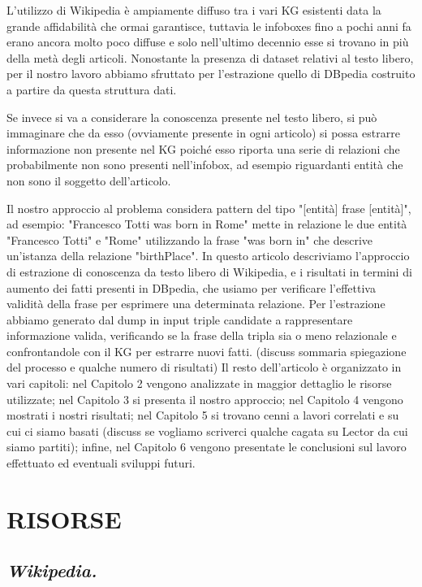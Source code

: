 \documentclass[10pt,a4paper,twocolumn]{article}
\begin{document}
L'utilizzo di Wikipedia è ampiamente diffuso tra i vari KG esistenti data la grande affidabilità che ormai garantisce, tuttavia le infoboxes fino a pochi anni fa erano ancora molto poco diffuse e solo nell'ultimo decennio esse si trovano in più della metà degli articoli. Nonostante la presenza di dataset relativi al testo libero, per il nostro lavoro abbiamo sfruttato per l'estrazione quello di DBpedia costruito a partire da questa struttura dati.

Se invece si va a considerare la conoscenza presente nel testo libero, si può immaginare che da esso (ovviamente presente in ogni articolo) si possa estrarre informazione non presente nel KG poiché esso riporta una serie di relazioni che probabilmente non sono presenti nell'infobox, ad esempio riguardanti entità che non sono il soggetto dell'articolo.

Il nostro approccio al problema considera pattern del tipo 
"[entità] frase [entità]", ad esempio: "Francesco Totti was born in Rome" mette in relazione le due entità "Francesco Totti" e "Rome" utilizzando la frase "was born in" che descrive un'istanza della relazione "birthPlace".
In questo articolo descriviamo l'approccio di estrazione di conoscenza da testo libero di Wikipedia, e i risultati in termini di aumento dei fatti presenti in DBpedia, che usiamo per verificare l'effettiva validità della frase per esprimere una determinata relazione.
Per l'estrazione abbiamo generato dal dump in input triple candidate a rappresentare informazione valida, verificando se la frase della tripla sia o meno relazionale e confrontandole con il KG per estrarre nuovi fatti.
(discuss sommaria spiegazione del processo e qualche numero di risultati)
Il resto dell'articolo è organizzato in vari capitoli: nel Capitolo 2 vengono analizzate in maggior dettaglio le risorse utilizzate; nel Capitolo 3 si presenta il nostro approccio; nel Capitolo 4 vengono mostrati i nostri risultati; nel Capitolo 5 si trovano cenni a lavori correlati e su cui ci siamo basati (discuss se vogliamo scriverci qualche cagata su Lector da cui siamo partiti); infine, nel Capitolo 6 vengono presentate le conclusioni sul lavoro effettuato ed eventuali sviluppi futuri.

\section{RISORSE}
\subsection*{\textit{Wikipedia.}}
\end{document}
